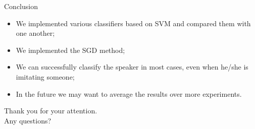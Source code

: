 \documentclass[10pt]{beamer}
\begin{document}
\begin{frame}{Conclusion}
  \begin{itemize}
    \item We implemented various classifiers based on SVM and compared them with one another;
    \item We implemented the SGD method;
    \item We can successfully classify the speaker in most cases, even when he/she is imitating someone;
    \item In the future we may want to average the results over more experiments.
  \end{itemize}
\end{frame}

\begin{frame}
\fontsize{15}{17}\selectfont
\begin{center}
Thank you for your attention. \\
\vspace{.4in}
Any questions?
\end{center}
\end{frame}
\end{document}
